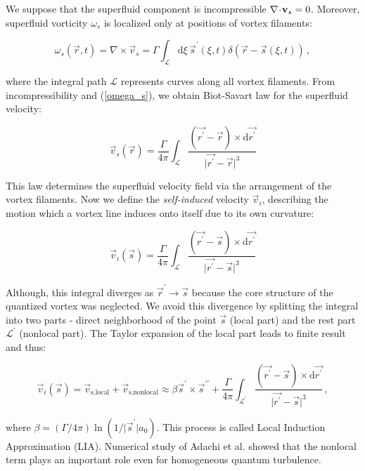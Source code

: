 We suppose that the superfluid component is incompressible $\nabla \!\cdot\! \mathbf{v}_s = 0$. Moreover, superfluid vorticity $\omega_s$ is localized only at positions of vortex filaments:

\begin{equation}
\omega_s(\vec{r},t) = \nabla \times \vec{v}_s
= \Gamma \int_{\mathcal{L}} \text{d}\xi \, \vec{s}^{\prime}(\xi, t) \delta (\vec{r} - \vec{s}(\xi,t))\,,
\label{omega_s}
\end{equation}

where the integral path $\mathcal{L}$ represents curves along all vortex filaments. From incompressibility and (\ref{omega_s}), we obtain Biot-Savart law for the superfluid velocity:

\begin{equation}
\vec{v}_s(\vec{r}) = \frac{\Gamma}{4\pi} \int_{\mathcal{L}} \frac{(\vec{r^{\prime}} - \vec{r}) \times \text{d}\vec{r^{\prime}}}{\vert \vec{r^{\prime}} - \vec{r} \vert^3}
\end{equation}

This law determines the superfluid velocity field via the arrangement of the vortex
filaments. Now we define the \textit{self-induced} velocity $\vec{v}_i$, describing the motion which a vortex line induces onto itself due to its own curvature:

\begin{equation}
\vec{v}_i(\vec{s}) = \frac{\Gamma}{4\pi} \int_{\mathcal{L}} \frac{(\vec{r^{\prime}} - \vec{s}) \times \text{d}\vec{r^{\prime}}}{\vert \vec{r^{\prime}} - \vec{s} \vert^3}
\end{equation}

Although, this integral diverges as $\vec{r}^{\prime} \rightarrow \vec{s}$ because the core structure
of the quantized vortex was neglected. We avoid this divergence by splitting the integral into two parts - direct neighborhood of the point $\vec{s}$ (local part) and the rest part $\mathcal{L}^{\prime}$ (nonlocal part). The Taylor expansion of the local part leads to finite result and thus:

\begin{equation}
\vec{v}_i(\vec{s})
= \vec{v}_{\text{s,local}} + \vec{v}_{\text{s,nonlocal}}
\approx \beta \vec{s}^{\prime} \times \vec{s}^{\prime \prime} + \frac{\Gamma}{4\pi} \int_{\mathcal{L}^{\prime}} \frac{(\vec{r^{\prime}} - \vec{s}) \times \text{d}\vec{r^{\prime}}}{\vert \vec{r^{\prime}} - \vec{s} \vert^3}\,,
\end{equation}

where $\beta = (\Gamma / 4\pi) \ln(1/\vert\vec{s}^{\prime}\vert a_0)$. This process is called Local Induction Approximation (LIA). Numerical study of Adachi et al. showed that the nonlocal term plays an important role even for homogeneous quantum turbulence.

